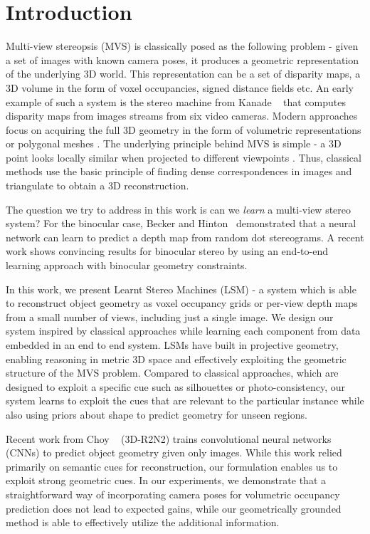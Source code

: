 \documentclass[../thesis.tex]{subfiles}
\begin{document}
\section{Introduction}

Multi-view stereopsis (MVS) is classically posed as the following problem - given a set of images with known camera poses, it produces a geometric representation of the underlying 3D world. This representation can be a set of disparity maps, a 3D volume in the form of voxel occupancies, signed distance fields etc. An early example of such a system is the stereo machine from Kanade \etal ~\cite{kanade1995development} that computes disparity maps from images streams from six video cameras. Modern approaches focus on acquiring the full 3D geometry in the form of volumetric representations or polygonal meshes \cite{seitz2006comparison}. The underlying principle behind MVS is simple - a 3D point looks locally similar when projected to different viewpoints \cite{kutulakos2000theory}. Thus, classical methods use the basic principle of finding dense correspondences in images and triangulate to obtain a 3D reconstruction.

The question we try to address in this work is can we \textit{learn} a multi-view stereo system? For the binocular case, Becker and Hinton~\cite{becker1992self} demonstrated that a neural network can learn to predict a depth map from random dot stereograms. A recent work \cite{kendall2017end} shows convincing results for binocular stereo by using an end-to-end learning approach with binocular geometry constraints.

In this work, we present Learnt Stereo Machines (LSM) - a system which is able to reconstruct object geometry as voxel occupancy grids or per-view depth maps from a small number of views, including just a single image. We design our system inspired by classical approaches while learning each component from data embedded in an end to end system. LSMs have built in projective geometry, enabling reasoning in metric 3D space and effectively exploiting the geometric structure of the MVS problem. Compared to classical approaches, which are designed to exploit a specific cue such as silhouettes or photo-consistency, our system learns to exploit the cues that are relevant to the particular instance while also using priors about shape to predict geometry for unseen regions.

Recent work from Choy \etal~\cite{choy20163d} (3D-R2N2) trains convolutional neural networks (CNNs) to predict object geometry given only images. While this work relied primarily on semantic cues for reconstruction, our formulation enables us to exploit strong geometric cues. In our experiments, we demonstrate that a straightforward way of incorporating camera poses for volumetric occupancy prediction does not lead to expected gains, while our geometrically grounded method is able to effectively utilize the additional information.
\end{document}
